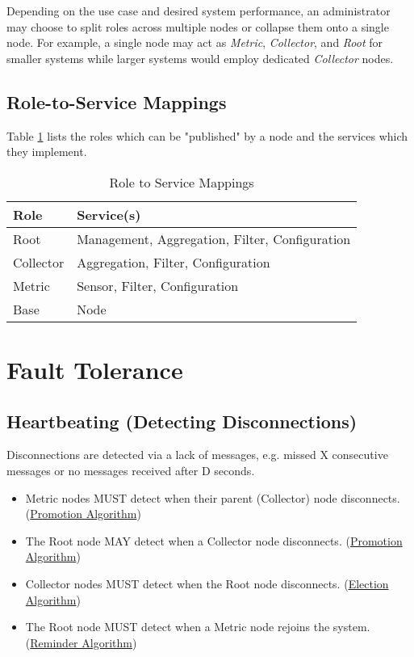 Depending on the use case and desired system performance, an administrator may choose to split roles across multiple
nodes or collapse them onto a single node. For example, a single node may act as \textit{Metric}, \textit{Collector},
and \textit{Root} for smaller systems while larger systems would employ dedicated \textit{Collector} nodes.

\subsection{Role-to-Service Mappings}

Table \ref{tab:role_to_services} lists the roles which can be "published" by a \dcamp node and the services which they implement.

\begin{table}
\begin{tabular}{|l|l|}
\hline
\textbf{Role} & \textbf{Service(s)} \\
\hline
Root & Management, Aggregation, Filter, Configuration \\
\hline
Collector & Aggregation, Filter, Configuration \\
\hline
Metric & Sensor, Filter, Configuration \\
\hline
Base & Node \\
\hline
\end{tabular}
\caption{Role to Service Mappings}
\label{tab:role_to_services}
\end{table}

\section{Fault Tolerance}

\subsection{Heartbeating (Detecting Disconnections)}

Disconnections are detected via a lack of messages, e.g. missed X consecutive messages or no messages received after D
seconds.

\begin{itemize}
\item Metric nodes MUST detect when their parent (Collector) node disconnects. (\hyperref[algor_promo]{Promotion Algorithm})
\item The Root node MAY detect when a Collector node disconnects. (\hyperref[algor_promo]{Promotion Algorithm})
\item Collector nodes MUST detect when the Root node disconnects. (\hyperref[algor_elect]{Election Algorithm})
\item The Root node MUST detect when a Metric node rejoins the system. (\hyperref[algor_remind]{Reminder Algorithm})
\end{itemize}

